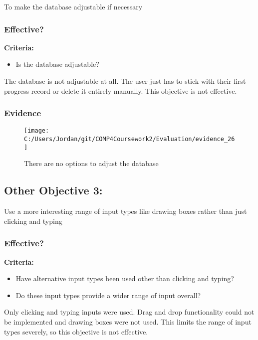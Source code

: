 To make the database adjustable if necessary

\subsubsection{Effective?}

\textbf{Criteria: }

\begin{itemize}
	\item Is the database adjustable?
\end{itemize}

The database is not adjustable at all. The user just has to stick with their first progress record or delete it entirely manually. This objective is not effective.

\subsubsection{Evidence}

\begin{figure}[H]
	\texttt{[image: C:/Users/Jordan/git/COMP4Coursework2/Evaluation/evidence\_26]}
	\caption{There are no options to adjust the database}
\end{figure}

\subsection{Other Objective 3: }

Use a more interesting range of input types like drawing boxes rather than just clicking and typing

\subsubsection{Effective?}

\textbf{Criteria: }

\begin{itemize}
	\item Have alternative input types been used other than clicking and typing?
	\item Do these input types provide a wider range of input overall?
\end{itemize}

Only clicking and typing inputs were used. Drag and drop functionality could not be implemented and drawing boxes were not used. This limits the range of input types severely, so this objective is not effective.

